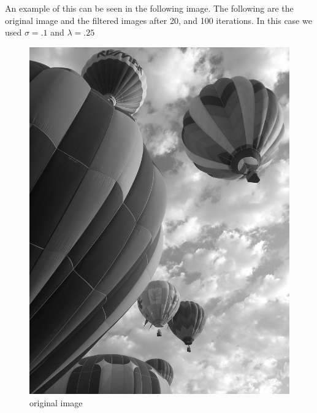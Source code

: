 An example of this can be seen in the following image.
The following are the original image and the filtered images after 20, and 100 iterations.
In this case we used $\sigma = .1$ and $\lambda = .25$

\begin{figure}[ht]
\begin{minipage}[b]{.45\linewidth}
\centering
\includegraphics[width=\textwidth]{baloonsbw}
\caption*{original image}
\end{minipage}
\hspace{0.5cm}
\begin{minipage}[b]{0.45\linewidth}
\centering

\end{minipage}
\end{figure}

